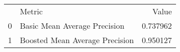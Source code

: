 \begin{tabular}{llr}
 & Metric & Value \\
0 & Basic Mean Average Precision & 0.737962 \\
1 & Boosted Mean Average Precision & 0.950127 \\
\end{tabular}

